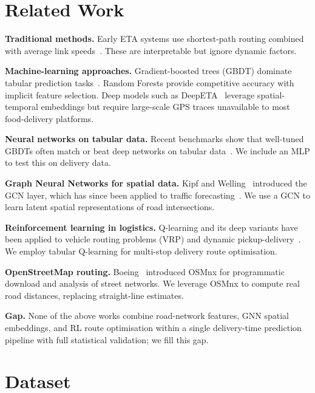 \documentclass[conference]{IEEEtran}
\begin{document}
\section{Related Work}
\label{sec:related}

\textbf{Traditional methods.}  Early ETA systems use shortest-path routing
combined with average link speeds~\cite{wang2014travel}.  These are
interpretable but ignore dynamic factors.

\textbf{Machine-learning approaches.}  Gradient-boosted trees (GBDT) dominate
tabular prediction tasks~\cite{shwartz2022tabular}.  Random Forests provide
competitive accuracy with implicit feature selection.  Deep models such as
DeepETA~\cite{wang2019deepeta} leverage spatial-temporal embeddings but require
large-scale GPS traces unavailable to most food-delivery platforms.

\textbf{Neural networks on tabular data.}  Recent benchmarks show that
well-tuned GBDTs often match or beat deep networks on tabular
data~\cite{grinsztajn2022why}.  We include an MLP to test this on delivery
data.

\textbf{Graph Neural Networks for spatial data.}  Kipf and
Welling~\cite{kipf2017gcn} introduced the GCN layer, which has since been
applied to traffic forecasting~\cite{yu2018stgcn}.  We use a GCN to learn
latent spatial representations of road intersections.

\textbf{Reinforcement learning in logistics.}  Q-learning and its deep
variants have been applied to vehicle routing problems (VRP) and dynamic
pickup-delivery~\cite{sutton2018rl}.  We employ tabular Q-learning for
multi-stop delivery route optimisation.

\textbf{OpenStreetMap routing.}  Boeing~\cite{boeing2017osmnx} introduced
OSMnx for programmatic download and analysis of street networks.  We leverage
OSMnx to compute real road distances, replacing straight-line estimates.

\textbf{Gap.}  None of the above works combine road-network features, GNN
spatial embeddings, and RL route optimisation within a single delivery-time
prediction pipeline with full statistical validation; we fill this gap.

\section{Dataset}
\label{sec:dataset}
\end{document}
